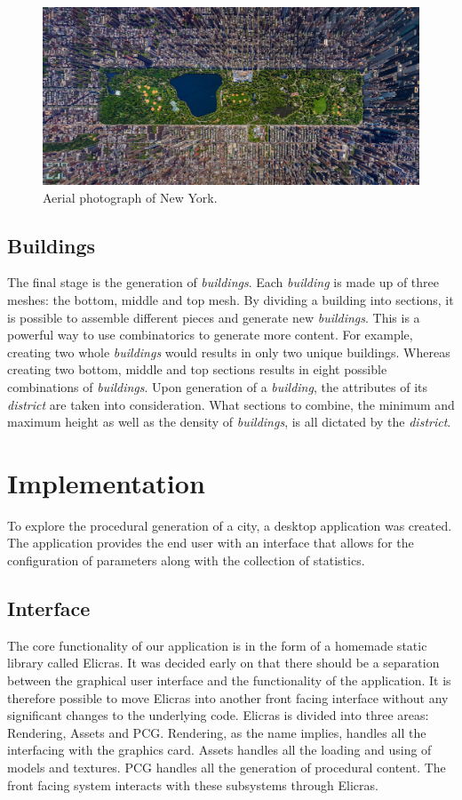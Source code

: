 	\begin{figure}[h]
		\centering
		\includegraphics[width=0.9\linewidth]{"Images/new york"}
		\caption{Aerial photograph of New York.}
		\label{fig:new-york}
	\end{figure}
		
	\subsection{Buildings}
	The final stage is the generation of \textit{buildings}. Each \textit{building} is made up of three meshes: the bottom, middle and top mesh. By dividing a building into sections, it is possible to assemble different pieces and generate new \textit{buildings}. This is a powerful way to use combinatorics to generate more content. For example, creating two whole \textit{buildings} would results in only two unique buildings. Whereas creating two bottom, middle and top sections results in eight possible combinations of \textit{buildings}. Upon generation of a \textit{building}, the attributes of its \textit{district} are taken into consideration. What sections to combine, the minimum and maximum height as well as the density of \textit{buildings}, is all dictated by the \textit{district}.

\section{Implementation}
To explore the procedural generation of a city, a desktop application was created. The application provides the end user with an interface that allows for the configuration of parameters along with the collection of statistics.
	
	\subsection{Interface}
	The core functionality of our application is in the form of a homemade static library called Elicras. It was decided early on that there should be a separation between the graphical user interface and the functionality of the application. It is therefore possible to move Elicras into another front facing interface without any significant changes to the underlying code. Elicras is divided into three areas: Rendering, Assets and PCG. Rendering, as the name implies, handles all the interfacing with the graphics card. Assets handles all the loading and using of models and textures. PCG handles all the generation of procedural content. The front facing system interacts with these subsystems through Elicras.
		

